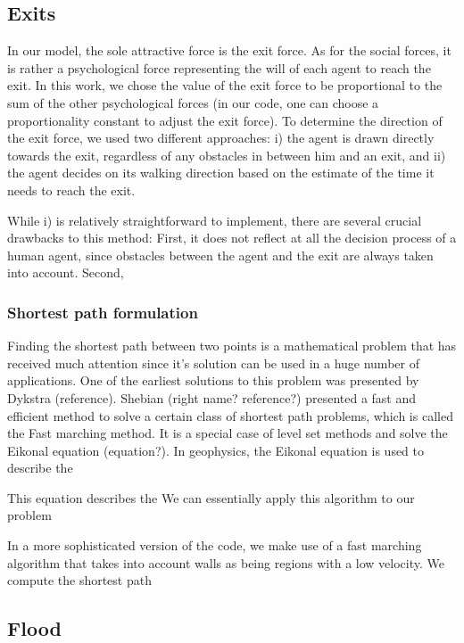 \documentclass[11pt]{article}
\begin{document}
\subsection{Exits}
\label{sec:Exits1}

In our model, the sole attractive force is the exit force. As for the social forces, it is rather a psychological force representing the will of each agent to reach the exit. In this work, we chose the value of the exit force to be proportional to the sum of the other psychological forces (in our code, one can choose a proportionality constant to adjust the exit force). To determine the direction of the exit force, we used two different approaches: i) the agent is drawn directly towards the exit, regardless of any obstacles in between him and an exit, and ii) the agent decides on its walking direction based on the estimate of the time it needs to reach the exit.

While i) is relatively straightforward to implement, there are several crucial drawbacks to this method: First, it does not reflect at all the decision process of a human agent, since obstacles between the agent and the exit are always taken into account. Second, 

\subsubsection{Shortest path formulation}

Finding the shortest path between two points is a mathematical problem that has received much attention since it's solution can be used in a huge number of applications. One of the earliest solutions to this problem was presented by Dykstra (reference). Shebian (right name? reference?) presented a fast and efficient method to solve a certain class of shortest path problems, which  is called the Fast marching method. It is a special case of level set methods and solve the Eikonal equation (equation?). In geophysics, the Eikonal equation is used to describe the 

This equation describes the We can essentially apply this algorithm to our problem

In a more sophisticated version of the code, we make use of a fast marching algorithm that takes into account walls as being regions with a low velocity. We compute the shortest path


\subsection{Flood}
\end{document}
